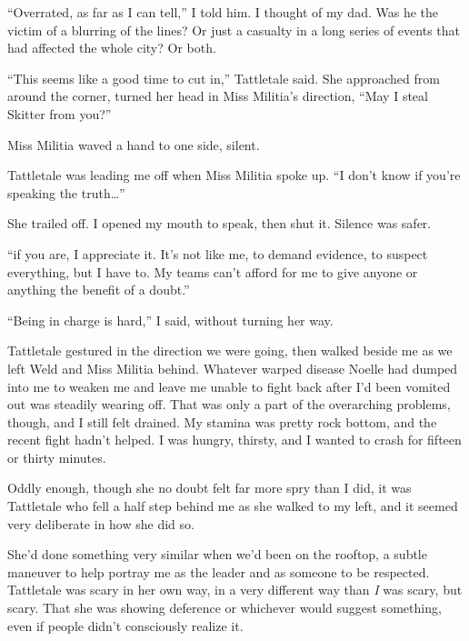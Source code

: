 ``Overrated, as far as I can tell,'' I told him.  I thought of my dad.  Was he the victim of a blurring of the lines?  Or just a casualty in a long series of events that had affected the whole city?  Or both.



``This seems like a good time to cut in,'' Tattletale said.  She approached from around the corner, turned her head in Miss Militia's direction, ``May I steal Skitter from you?''



Miss Militia waved a hand to one side, silent.



Tattletale was leading me off when Miss Militia spoke up.  ``I don't know if you're speaking the truth\ldots''



She trailed off.  I opened my mouth to speak, then shut it.  Silence was safer.



``\ldotsBut if you are, I appreciate it.  It's not like me, to demand evidence, to suspect everything, but I have to.  My teams can't afford for me to give anyone or anything the benefit of a doubt.''



``Being in charge is hard,'' I said, without turning her way.



Tattletale gestured in the direction we were going, then walked beside me as we left Weld and Miss Militia behind.  Whatever warped disease Noelle had dumped into me to weaken me and leave me unable to fight back after I'd been vomited out was steadily wearing off.  That was only a part of the overarching problems, though, and I still felt drained.  My stamina was pretty rock bottom, and the recent fight hadn't helped.  I was hungry, thirsty, and I wanted to crash for fifteen or thirty minutes.



Oddly enough, though she no doubt felt far more spry than I did, it was Tattletale who fell a half step behind me as she walked to my left, and it seemed very deliberate in how she did so.



She'd done something very similar when we'd been on the rooftop, a subtle maneuver to help portray me as the leader and as someone to be respected.  Tattletale was scary in her own way, in a very different way than \emph{I }was scary, but scary.  That she was showing deference or whichever would suggest something, even if people didn't consciously realize it.




